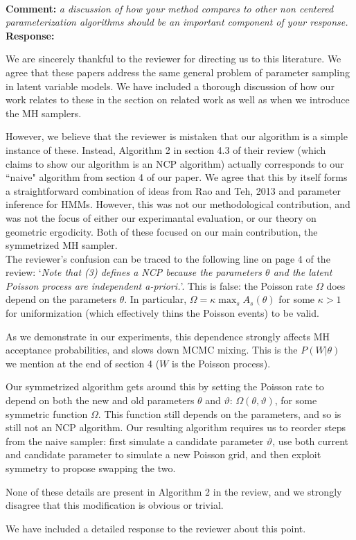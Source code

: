 \documentclass[11pt]{article}
\newcommand{\rev}[1]{\textbf{Comment: }\emph{#1}}
\newcommand{\resp}{\textbf{Response: }}
\begin{document}
~\\
\rev{a discussion of how your method compares to other non centered parameterization algorithms should be an important component of your response.} \\ 
\resp{We are sincerely thankful to the reviewer for directing us to this literature. 
  We agree that these papers address the same general problem of parameter sampling in latent variable models. 
We have included a thorough discussion of how our work relates to these in the section on related work as well as when we introduce the MH samplers. %

However, we believe that the reviewer is mistaken that our algorithm is a simple instance of these. 
Instead, Algorithm 2 in section 4.3 of their review (which claims to show our algorithm is an NCP algorithm) actually corresponds to our ``naive" algorithm from section 4 of our paper. 
We agree that this by itself forms a straightforward combination of ideas from Rao and Teh, 2013 and parameter inference for HMMs. However, this was not our methodological contribution, and was not the focus of either our experimantal evaluation, or our theory on geometric ergodicity. Both of these focused on our main contribution, the symmetrized MH sampler. 
~\\

The reviewer's confusion can be traced to the following line on page 4 of the review: `{\em Note that (3) defines a NCP because the parameters $\theta$ and the latent Poisson process are independent a-priori.}'. 
This is false: the Poisson rate $\Omega$ does depend on the parameters $\theta$. In particular, $\Omega = \kappa \max_s A_s(\theta)$ for some $\kappa > 1$ for uniformization (which effectively thins the Poisson events) to be valid. 

As we demonstrate in our experiments, this dependence strongly affects MH acceptance probabilities, and slows down MCMC mixing. 
This is the $P(W|\theta)$ we mention at the end of section 4 ($W$ is the Poisson process). 

Our symmetrized algorithm gets around this by setting the Poisson rate to depend on both the new and old parameters $\theta$ and $\vartheta$: $\Omega(\theta,\vartheta)$, for some symmetric function $\Omega$. This function still depends on the parameters, and so is still not an NCP algorithm. Our resulting algorithm requires us to reorder steps from the naive sampler: first simulate a candidate parameter $\vartheta$, use both current and candidate parameter to simulate a new Poisson grid, and then exploit symmetry to propose swapping the two.

None of these details are present in Algorithm 2 in the review, and we strongly disagree that this modification is obvious or trivial. 

We have included a detailed response to the reviewer about this point.

}
\end{document}
